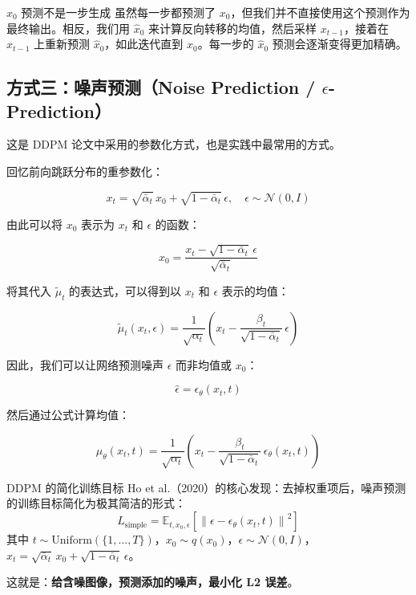 \documentclass[a4paper]{article}
\begin{document}
\begin{warningbox}{$x_0$ 预测不是一步生成}
虽然每一步都预测了 $x_0$，但我们并不直接使用这个预测作为最终输出。相反，我们用 $\hat{x}_0$ 来计算反向转移的均值，然后采样 $x_{t-1}$，接着在 $x_{t-1}$ 上重新预测 $\hat{x}_0$，如此迭代直到 $x_0$。每一步的 $\hat{x}_0$ 预测会逐渐变得更加精确。
\end{warningbox}

\subsection{方式三：噪声预测（Noise Prediction / $\epsilon$-Prediction）}

这是 DDPM 论文中采用的参数化方式，也是实践中最常用的方式。

回忆前向跳跃分布的重参数化：

$$x_t = \sqrt{\bar{\alpha}_t}\, x_0 + \sqrt{1 - \bar{\alpha}_t}\, \epsilon, \quad \epsilon \sim \mathcal{N}(0, I)$$

由此可以将 $x_0$ 表示为 $x_t$ 和 $\epsilon$ 的函数：

$$x_0 = \frac{x_t - \sqrt{1 - \bar{\alpha}_t}\, \epsilon}{\sqrt{\bar{\alpha}_t}}$$

将其代入 $\tilde{\mu}_t$ 的表达式，可以得到以 $x_t$ 和 $\epsilon$ 表示的均值：

$$\tilde{\mu}_t(x_t, \epsilon) = \frac{1}{\sqrt{\alpha_t}}\left(x_t - \frac{\beta_t}{\sqrt{1 - \bar{\alpha}_t}}\, \epsilon\right)$$

因此，我们可以让网络预测噪声 $\epsilon$ 而非均值或 $x_0$：

$$\hat{\epsilon} = \epsilon_\theta(x_t, t)$$

然后通过公式计算均值：

$$\mu_\theta(x_t, t) = \frac{1}{\sqrt{\alpha_t}}\left(x_t - \frac{\beta_t}{\sqrt{1 - \bar{\alpha}_t}}\, \epsilon_\theta(x_t, t)\right)$$

\begin{importantbox}{DDPM 的简化训练目标}
Ho et al.（2020）的核心发现：去掉权重项后，噪声预测的训练目标简化为极其简洁的形式：
$$L_{\text{simple}} = \mathbb{E}_{t, x_0, \epsilon}\left[\left\| \epsilon - \epsilon_\theta(x_t, t) \right\|^2\right]$$
其中 $t \sim \text{Uniform}(\{1, \dots, T\})$，$x_0 \sim q(x_0)$，$\epsilon \sim \mathcal{N}(0, I)$，$x_t = \sqrt{\bar{\alpha}_t}\, x_0 + \sqrt{1 - \bar{\alpha}_t}\, \epsilon$。

这就是：\textbf{给含噪图像，预测添加的噪声，最小化 L2 误差}。
\end{importantbox}
\end{document}
